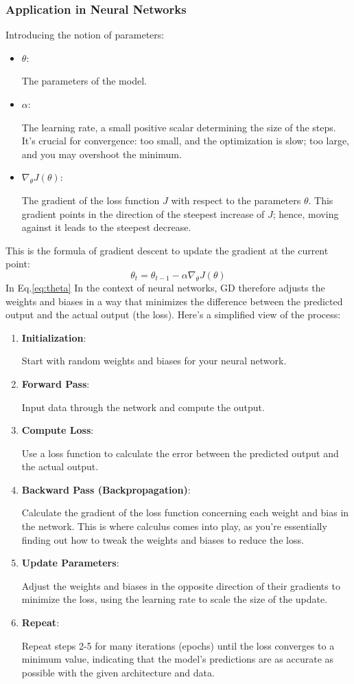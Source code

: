 \documentclass[oneside]{article}
\begin{document}
\subsubsection{Application in Neural Networks}
Introducing the notion of parameters:
\begin{itemize}
    \item \( \theta \):\par The parameters of the model.
    \item \( \alpha \):\par  The learning rate, a small positive scalar determining the size of the steps. It's crucial for convergence: too small, and the optimization is slow; too large, and you may overshoot the minimum.
    \item \( \nabla_\theta J(\theta) \):\par  The gradient of the loss function \( J \) with respect to the parameters \( \theta \). This gradient points in the direction of the steepest increase of \( J \); hence, moving against it leads to the steepest decrease.
\end{itemize}
This is the formula of gradient descent to update the gradient at the current point:
\begin{equation}
    \theta_t = \theta_{t-1} - \alpha \nabla_\theta J(\theta)
    \label{eq:theta}
\end{equation}
In Eq.\ref{eq:theta}
In the context of neural networks, GD therefore adjusts the weights and biases in a way that minimizes the difference between the predicted output and the actual output (the loss). Here's a simplified view of the process:
\begin{enumerate}
    \item  \textbf{Initialization}:\par
    Start with random weights and biases for your neural network.
    \item  \textbf{Forward Pass}: \par
    Input data through the network and compute the output.
    \item  \textbf{Compute Loss}: \par
    Use a loss function to calculate the error between the predicted output and the actual output.
    \item  \textbf{Backward Pass (Backpropagation)}:\par
    Calculate the gradient of the loss function concerning each weight and bias in the network. This is where calculus comes into play, as you're essentially finding out how to tweak the weights and biases to reduce the loss.
    \item  \textbf{Update Parameters}:\par
    Adjust the weights and biases in the opposite direction of their gradients to minimize the loss, using the learning rate to scale the size of the update.
    \item  \textbf{Repeat}: \par
    Repeat steps 2-5 for many iterations (epochs) until the loss converges to a minimum value, indicating that the model's predictions are as accurate as possible with the given architecture and data.
\end{enumerate}\par
\end{document}
